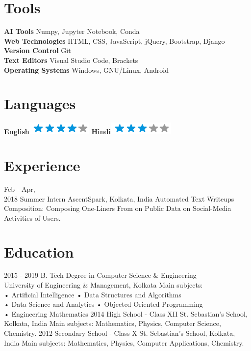 \documentclass[]{friggeri-cv}
\begin{document}
\begin{aside}
  \section{Tools}
    \textbf{AI Tools} {Numpy, Jupyter Notebook, Conda}
    \textbf{\\Web Technologies} {HTML, CSS, JavaScript, jQuery, Bootstrap, Django}
    \textbf{\\Version Control} {Git}
    \textbf{\\Text Editors} {Visual Studio Code, Brackets}
    \textbf{\\Operating Systems} {Windows, GNU/Linux, Android}
    ~
  \section{Languages}
    \textbf{English}\includegraphics[scale=0.40]{img/4stars.png}
    \textbf{Hindi}\includegraphics[scale=0.40]{img/3stars.png}
    ~
\end{aside}

\section{Experience}
\begin{entrylist}
    \entry
    {Feb - Apr, \\ 2018}
    {Summer Intern}
    {AscentSpark, Kolkata, India}
    {Automated Text Writeups Composition: Composing One-Liners From on Public Data on Social-Media Activities of Users.}
\end{entrylist}

\section{Education}
\begin{entrylist}
  \entry
    {2015 - 2019}
    {B. Tech Degree in Computer Science \& Engineering\\}
    {University of Engineering \& Management, Kolkata}
    {Main subjects: \\
        • Artificial Intelligence \qquad \qquad \qquad
        • Data Structures and Algorithms\\
        • Data Science and Analytics \quad \quad \hspace{1mm}
        • Objected Oriented Programming\\
        • Engineering Mathematics
    }
  \entry
    {2014}
    {High School - Class XII}
    {St. Sebastian's School, Kolkata, India}
    {Main subjects: Mathematics, Physics, Computer Science, Chemistry.}
   \entry
    {2012}
    {Secondary School - Class X}
    {St. Sebastian's School, Kolkata, India}
    {Main subjects: Mathematics, Physics, Computer Applications, Chemistry.}
\end{entrylist}
\end{document}
